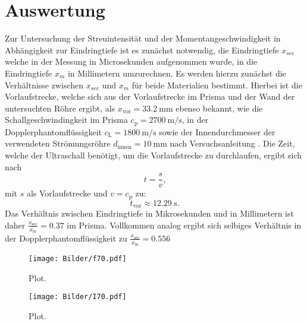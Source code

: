 \section{Auswertung}
\label{sec:Auswertung}





Zur Untersuchung der Streuintensität und der Momentangeschwindigkeit in Abhängigkeit zur Eindringtiefe ist es zunächst notwendig, die Eindringtiefe $x_{sec}$ welche in der Messung in Microsekunden aufgenommen wurde, in die Eindringtiefe $x_{m}$ in Millimetern umzurechnen.
Es werden hierzu zunächst die Verhältnisse zwischen $x_{sec}$ und $x_{m}$ für beide Materialien bestimmt.
Hierbei ist die Vorlaufstrecke, welche sich aus der Vorlaufstrecke im Prisma und der Wand der untersuchten Röhre ergibt, als $x_\mathrm{vor}=\SI{33.2}{\milli\meter}$ ebenso bekannt, wie die Schallgeschwindingkeit im Prisma $c_\mathrm{p}=\SI{2700}{\meter\per\second}$, in der Dopplerphantomflüssigkeit $c_\mathrm{L}=\SI{1800}{\meter\per\second}$ sowie der Innendurchmesser der verwendeten Strömungsröhre $d_\mathrm{innen}=\SI{10}{\milli\meter}$ nach Versuchsanleitung \cite{Anleitung}.
Die Zeit, welche der Ultraschall benötigt, um die Vorlaufstrecke zu durchlaufen, ergibt sich nach
\begin{equation*}
  t=\frac{s}{v} \text{,}
\end{equation*}
mit $s$ als Vorlaufstrecke und $v=c_\mathrm{p}$ zu:
\begin{equation*}
    t_\mathrm{vor}\approx\SI{12.29}{\second}\text{.}
\end{equation*}
Das Verhältnis zwischen Eindringtiefe in Mikrosekunden und in Millimetern ist daher $\frac{x_\mathrm{sec}}{x_\mathrm{m}}=0.37$ im Prisma. Vollkommen analog ergibt sich selbiges Verhältnis in der Dopplerphantomflüssigkeit zu $\frac{x_\mathrm{sec}}{x_\mathrm{m}}=0.556$
\begin{figure}
  \centering
  \texttt{[image: Bilder/f70.pdf]}
  \caption{Plot.}
  \label{fig:f70}
\end{figure}
\begin{figure}
  \centering
  \texttt{[image: Bilder/I70.pdf]}
  \caption{Plot.}
  \label{fig:I70}
\end{figure}

